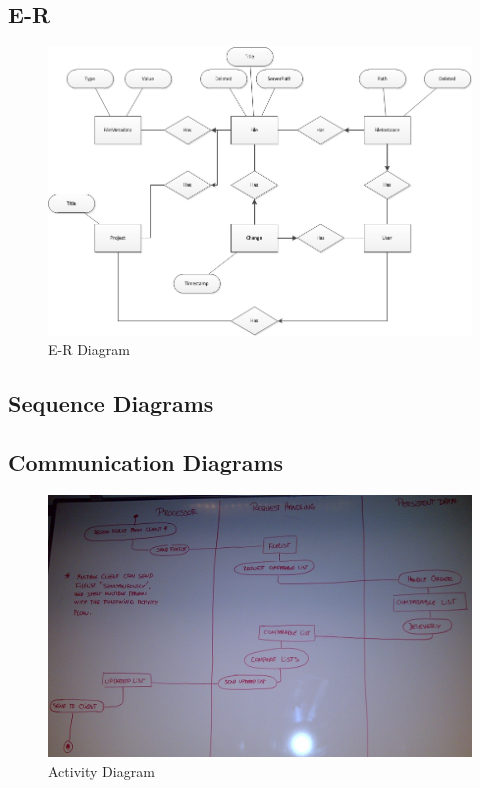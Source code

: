 \subsection{E-R}
\begin{figure}[H]
  \includegraphics[width=\textwidth,natwidth=863,natheight=587]{illustrations/E-R.png}
  \caption{E-R Diagram}
  \label{erdiagram}
\end{figure}
\subsection{Sequence Diagrams}
\subsection{Communication Diagrams}
\begin{figure}[H]
  \includegraphics[width=\textwidth,natwidth=2456,natheight=1522]{illustrations/ActivityDiagram.jpg}
  \caption{Activity Diagram}
  \label{activitydiagram}
\end{figure}
\newpage